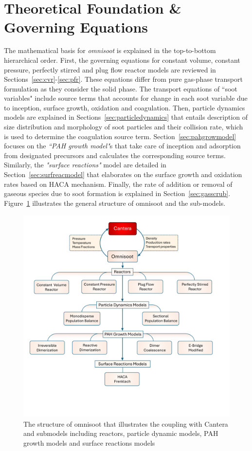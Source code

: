 \section{Theoretical Foundation \& Governing Equations}
The mathematical basis for \textit{omnisoot} is explained in the top-to-bottom hierarchical order. First, the governing equations for constant volume, constant pressure, perfectly stirred and plug flow reactor models are reviewed in Sections~\ref{sec:cvr}-\ref{sec:pfr}. These equations differ from pure gas-phase transport formulation as they consider the solid phase. The transport equations of ``soot variables" include source terms that accounts for change in each soot variable due to inception, surface growth, oxidation and coagulation. Then, particle dynamics models are explained in Sections~\ref{sec:particledynamics} that entails description of size distribution and morphology of soot particles and their collision rate, which is used to determine the coagulation source term. Section~\ref{sec:pahgrowmodel} focuses on the \textit{``PAH growth model"}s that take care of inception and adsorption from designated precursors and calculates the corresponding source terms. Similarly, the \textit{"surface reactions"} model are detailed in Section~\ref{sec:surfreacmodel} that elaborates on the surface growth and oxidation rates based on HACA mechanism. Finally, the rate of addition or removal of gaseous species due to soot formation is explained in Section~\ref{sec:gasscrub}. Figure~\ref{fig:structure} illustrates the general structure of omnisoot and the sub-models.

\begin{figure}[!htbp]
	\centering
	\includegraphics[height=110mm, ]{Figures/Theory/structure.pdf}
	\caption{The structure of omnisoot that illustrates the coupling with Cantera and submodels including reactors, particle dynamic models, PAH growth models and surface reactions models}
	\label{fig:structure}
\end{figure}

